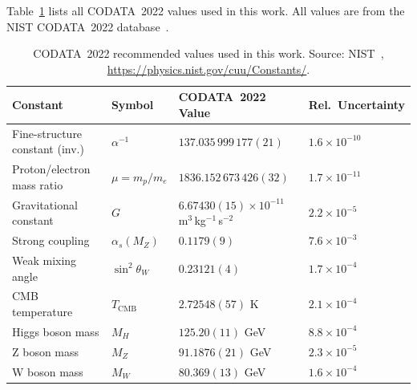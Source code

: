 \documentclass[11pt,a4paper]{article}
\begin{document}
Table~\ref{tab:codata} lists all CODATA~2022 values used in this work. All
values are from the NIST CODATA~2022 database~\cite{codata2022}.

\begin{table}[H]
\centering
\caption{CODATA~2022 recommended values used in this work.
  Source: NIST~\cite{codata2022},
  \url{https://physics.nist.gov/cuu/Constants/}.}
\label{tab:codata}
\begin{tabular}{llll}
\toprule
Constant & Symbol & CODATA~2022 Value & Rel.\ Uncertainty \\
\midrule
Fine-structure constant (inv.) & $\alpha^{-1}$ & $137.035\,999\,177(21)$ & $1.6\times 10^{-10}$ \\
Proton/electron mass ratio & $\mu=m_p/m_e$ & $1836.152\,673\,426(32)$ & $1.7\times 10^{-11}$ \\
Gravitational constant & $G$ & $6.67430(15)\times 10^{-11}$ m$^{3}$\,kg$^{-1}$\,s$^{-2}$ & $2.2\times 10^{-5}$ \\
Strong coupling & $\alpha_s(M_Z)$ & $0.1179(9)$ & $7.6\times 10^{-3}$ \\
Weak mixing angle & $\sin^{2}\!\theta_W$ & $0.23121(4)$ & $1.7\times 10^{-4}$ \\
CMB temperature & $T_{\mathrm{CMB}}$ & $2.72548(57)$ K & $2.1\times 10^{-4}$ \\
Higgs boson mass & $M_H$ & $125.20(11)$ GeV & $8.8\times 10^{-4}$ \\
Z boson mass & $M_Z$ & $91.1876(21)$ GeV & $2.3\times 10^{-5}$ \\
W boson mass & $M_W$ & $80.369(13)$ GeV & $1.6\times 10^{-4}$ \\
\bottomrule
\end{tabular}
\end{table}
\end{document}
